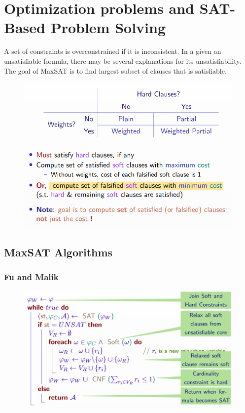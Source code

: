 \documentclass[10pt,a4paper]{report}
\begin{document}
\chapter{Optimization problems and SAT-Based Problem Solving}
A set of constraints is overconstrained if it is inconsistent. In a given an unsatisfiable formula, there may be several explanations for its unsatisfiability. The goal of MaxSAT is to find largest subset of clauses that is satisfiable.
\begin{figure}[H]
    \centering
    \includegraphics[scale=0.5]{9.png}
\end{figure}

\section{MaxSAT Algorithms}
\subsection{Fu and Malik}
\begin{figure}[H]
    \centering
    \includegraphics[scale=0.5]{10.png}
\end{figure}
\end{document}
